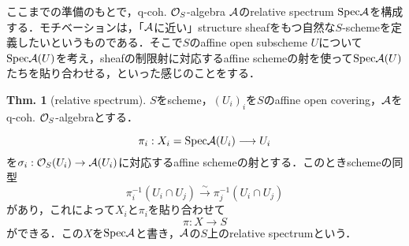 \documentclass[dvipdfmx,b5paper,papersize]{jsarticle}
\theoremstyle{definition}
\newtheorem{thm}{Thm.}
\begin{document}
ここまでの準備のもとで，q-coh. ${\cal{O}}_S$-algebra $\cal{A}$のrelative spectrum ${\rm Spec}{\cal{A}}$を構成する．モチベーションは，「${\cal{A}}$に近い」structure sheafをもつ自然な$S$-schemeを定義したいというものである．そこで$S$のaffine open subscheme $U$について${\rm Spec}{\cal{A}}(U)$を考え，sheafの制限射に対応するaffine schemeの射を使って${\rm Spec}{\cal{A}}(U)$たちを貼り合わせる，といった感じのことをする．
\begin{thm}[relative spectrum]\label{thm:glueing}
  $S$をscheme，$(U_i)_i$を$S$のaffine open covering，$\cal{A}$をq-coh. ${\cal{O}}_S$-algebraとする．

  \[
    \pi_i:X_i={\rm Spec}{\cal{A}}(U_i) \longrightarrow U_i
  \]
  を$\sigma_i:{\cal{O}}_{S}(U_i) \to {\cal{A}}(U_i)$に対応するaffine schemeの射とする．このときschemeの同型
  \[
    \pi_{i}^{-1}(U_i\cap U_j) \xrightarrow{\sim} \pi_{j}^{-1}(U_i\cap U_j)
  \]
  があり，これによって$X_i$と$\pi_i$を貼り合わせて
  \[
    \pi:X \longrightarrow S
  \]
  ができる．この$X$を${\rm Spec}{\cal{A}}$と書き，$\cal{A}$の$S$上のrelative spectrumという．
\end{thm}
\end{document}
